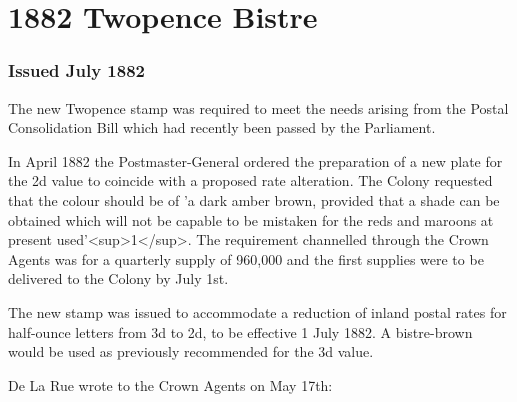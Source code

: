 \chapter{1882 Twopence Bistre}  
\subsection{Issued July 1882}

The new Twopence stamp was required to meet the needs arising from the Postal Consolidation Bill which had recently been passed by the Parliament.

In April 1882 the Postmaster-General ordered the preparation of a new plate for
the 2d value to coincide with a proposed rate alteration. The Colony requested that the colour should be of 'a dark amber brown, provided that a shade can be obtained which will not be capable to be mistaken for the reds and maroons at present used'<sup>1</sup>. The requirement channelled through the Crown Agents was for a quarterly supply of 960,000 and the first supplies were to be delivered to the Colony by July 1st.

The new stamp was issued to accommodate a reduction of inland postal rates for half-ounce letters from 3d to 2d, to be effective 1 July 1882. A bistre-brown would be used as previously recommended for the 3d value.





De La Rue wrote to the Crown Agents on May 17th:


